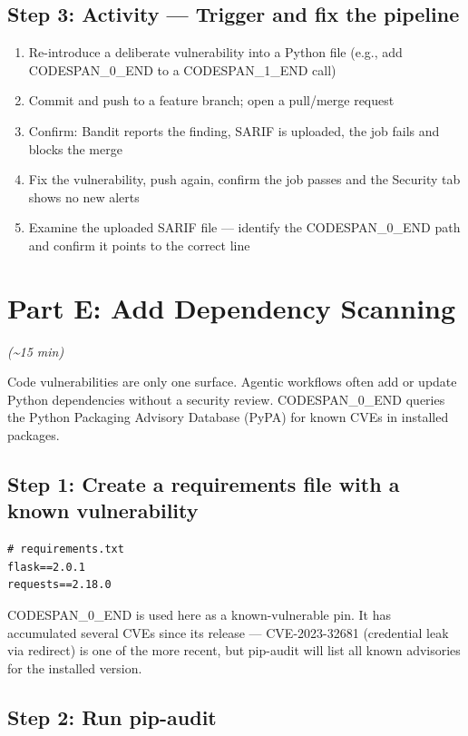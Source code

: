\documentclass[11pt,a4paper]{book}
\begin{document}
\subsection{Step 3: Activity --- Trigger and fix the pipeline}

\begin{enumerate}
  \item Re-introduce a deliberate vulnerability into a Python file (e.g., add CODESPAN\_0\_END to a CODESPAN\_1\_END call)
  \item Commit and push to a feature branch; open a pull/merge request
  \item Confirm: Bandit reports the finding, SARIF is uploaded, the job fails and blocks the merge
  \item Fix the vulnerability, push again, confirm the job passes and the Security tab shows no new alerts
  \item Examine the uploaded SARIF file --- identify the CODESPAN\_0\_END path and confirm it points to the correct line
\end{enumerate}

\medskip

\section{Part E: Add Dependency Scanning}

\textit{(\textasciitilde{}15 min)}

Code vulnerabilities are only one surface. Agentic workflows often add or update Python dependencies without a security review. CODESPAN\_0\_END queries the Python Packaging Advisory Database (PyPA) for known CVEs in installed packages.

\subsection{Step 1: Create a requirements file with a known vulnerability}

\begin{lstlisting}
# requirements.txt
flask==2.0.1
requests==2.18.0
\end{lstlisting}

CODESPAN\_0\_END is used here as a known-vulnerable pin. It has accumulated several CVEs since its release --- CVE-2023-32681 (credential leak via redirect) is one of the more recent, but pip-audit will list all known advisories for the installed version.

\subsection{Step 2: Run pip-audit}
\end{document}
